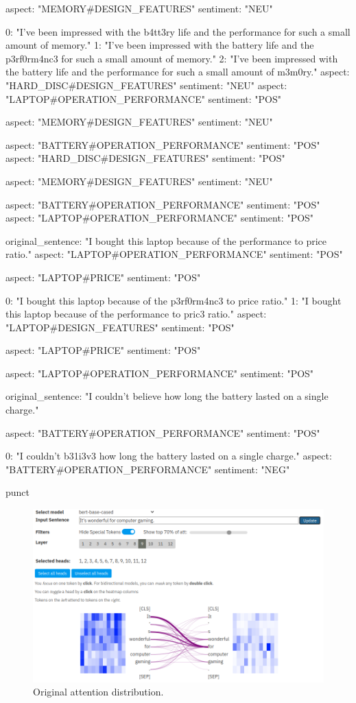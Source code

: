     aspect: "MEMORY#DESIGN_FEATURES"
    sentiment: "NEU"

0: "I've been impressed with the b4tt3ry life and the performance for such a small amount of memory."
1: "I've been impressed with the battery life and the p3rf0rm4nc3 for such a small amount of memory."
2: "I've been impressed with the battery life and the performance for such a small amount of m3m0ry."
aspect: "HARD_DISC#DESIGN_FEATURES"
sentiment: "NEU"
aspect: "LAPTOP#OPERATION_PERFORMANCE"
sentiment: "POS"

    aspect: "MEMORY#DESIGN_FEATURES"
    sentiment: "NEU"

aspect: "BATTERY#OPERATION_PERFORMANCE"
sentiment: "POS"
aspect: "HARD_DISC#DESIGN_FEATURES"
sentiment: "POS"

    aspect: "MEMORY#DESIGN_FEATURES"
    sentiment: "NEU"

aspect: "BATTERY#OPERATION_PERFORMANCE"
sentiment: "POS"
aspect: "LAPTOP#OPERATION_PERFORMANCE"
sentiment: "POS"


original_sentence: "I bought this laptop because of the performance to price ratio."
aspect: "LAPTOP#OPERATION_PERFORMANCE"
sentiment: "POS"

    aspect: "LAPTOP#PRICE"
    sentiment: "POS"

0: "I bought this laptop because of the p3rf0rm4nc3 to price ratio."
1: "I bought this laptop because of the performance to pric3 ratio."
aspect: "LAPTOP#DESIGN_FEATURES"
sentiment: "POS"

    aspect: "LAPTOP#PRICE"
    sentiment: "POS"

aspect: "LAPTOP#OPERATION_PERFORMANCE"
sentiment: "POS"


original_sentence: "I couldn't believe how long the battery lasted on a single charge."

    aspect: "BATTERY#OPERATION_PERFORMANCE"
    sentiment: "POS"

0: "I couldn't b31i3v3 how long the battery lasted on a single charge."
aspect: "BATTERY#OPERATION_PERFORMANCE"
sentiment: "NEG"

punct




\begin{figure}
    \centering
    \includegraphics[width =.8\textwidth]{img/attention_punctuation_original.png}
    \caption{Original attention distribution.}
    \label{fig:attention_punct_original}
\end{figure}

